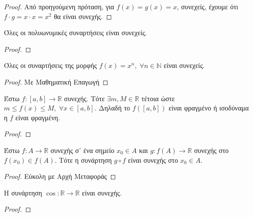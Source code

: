 \documentclass[main.tex]{subfiles}
\begin{document}
\begin{proof}
    Από προηγούμενη πρόταση, για $ f(x)=g(x) = x $, συνεχείς, έχουμε ότι     
    $ f\cdot g = x\cdot x = x^{2} $ θα είναι συνεχής.
\end{proof}

\begin{prop}
    Όλες οι πολυωνυμικές συναρτήσεις είναι συνεχείς.
\end{prop}

\begin{proof}

\end{proof}

\begin{prop}
    Όλες οι συναρτήσεις της μορφής $ f(x)= x^{n}, \; \forall n \in \mathbb{N} $
    είναι συνεχείς.
\end{prop}

\begin{proof}
    Με Μαθηματική Επαγωγή 
\end{proof}

\begin{thm}
    Έστω $ f \colon [a,b] \to \mathbb{R} $ συνεχής. Τότε $ \exists m,M \in \mathbb{R} $ 
    τέτοια ώστε $ m \leq f(x) \leq M, \; \forall x \in [a,b] $. Δηλαδή το $ f([a,b]) $ 
    είναι φραγμένο ή ισοδύναμα η $f$ είναι φραγμένη.
\end{thm}

\begin{proof}
    
\end{proof}

\begin{prop}
    Έστω $ f \colon A \to \mathbb{R} $ συνεχής σ᾽ ένα σημείο $ x_{0} \in A $ και 
    $ g \colon f(A) \to \mathbb{R} $ συνεχής στο $ f(x_{0}) \in f(A) $. Τότε η 
    συνάρτηση $ g \circ f $ είναι συνεχής στο $ x_{0} \in A $.
\end{prop}

\begin{proof}
    Εύκολη με Αρχή Μεταφοράς
\end{proof}

\begin{prop}
    Η συνάρτηση $ \cos{} \colon \mathbb{R} \to \mathbb{R} $ είναι συνεχής.
\end{prop}

\begin{proof}
    
\end{proof}
\end{document}
